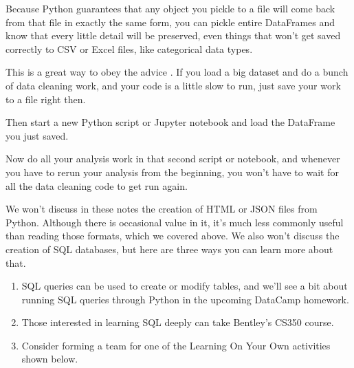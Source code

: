 \documentclass[letterpaper,10pt,english]{sphinxmanual}
\begin{document}
Because Python guarantees that any object you pickle to a file will come back from that file in exactly the same form, you can pickle entire DataFrames and know that every little detail will be preserved, even things that won’t get saved correctly to CSV or Excel files, like categorical data types.

This is a great way to obey the advice .  If you load a big dataset and do a bunch of data cleaning work, and your code is a little slow to run, just save your work to a file right then.

\begin{sphinxVerbatim}[commandchars=\\\{\}]
  
\end{sphinxVerbatim}

Then start a new Python script or Jupyter notebook and load the DataFrame you just saved.

\begin{sphinxVerbatim}[commandchars=\\\{\}]
    
\end{sphinxVerbatim}

Now do all your analysis work in that second script or notebook, and whenever you have to re\sphinxhyphen{}run your analysis from the beginning, you won’t have to wait for all the data cleaning code to get run again.

We won’t discuss in these notes the creation of HTML or JSON files from Python.  Although there is occasional value in it, it’s much less commonly useful than reading those formats, which we covered above.  We also won’t discuss the creation of SQL databases, but here are three ways you can learn more about that.
\begin{enumerate}
%
\item {} 
SQL queries can be used to create or modify tables, and we’ll see a bit about running SQL queries through Python in the upcoming DataCamp homework.

\item {} 
Those interested in learning SQL deeply can take Bentley’s CS350 course.

\item {} 
Consider forming a team for one of the Learning On Your Own activities shown below.

\end{enumerate}
\end{document}
